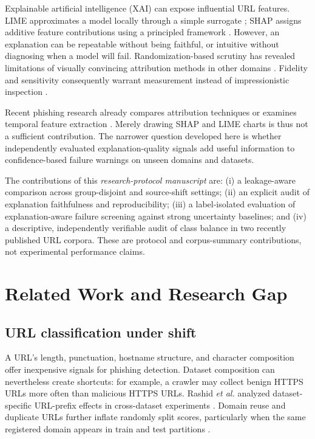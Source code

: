 \documentclass[conference,letterpaper]{IEEEtran}
\begin{document}
Explainable artificial intelligence (XAI) can expose influential URL features. LIME approximates a model locally through a simple surrogate \cite{ribeiro2016}; SHAP assigns additive feature contributions using a principled framework \cite{lundberg2017}. However, an explanation can be repeatable without being faithful, or intuitive without diagnosing when a model will fail. Randomization-based scrutiny has revealed limitations of visually convincing attribution methods in other domains \cite{adebayo2018}. Fidelity and sensitivity consequently warrant measurement instead of impressionistic inspection \cite{yeh2019}.

Recent phishing research already compares attribution techniques or examines temporal feature extraction \cite{panthi2026,mayo2026,limephish2025}. Merely drawing SHAP and LIME charts is thus not a sufficient contribution. The narrower question developed here is whether independently evaluated explanation-quality signals add useful information to confidence-based failure warnings on unseen domains and datasets.

The contributions of this \emph{research-protocol manuscript} are: (i) a leakage-aware comparison across group-disjoint and source-shift settings; (ii) an explicit audit of explanation faithfulness and reproducibility; (iii) a label-isolated evaluation of explanation-aware failure screening against strong uncertainty baselines; and (iv) a descriptive, independently verifiable audit of class balance in two recently published URL corpora. These are protocol and corpus-summary contributions, not experimental performance claims.

\section{Related Work and Research Gap}
\subsection{URL classification under shift}
A URL's length, punctuation, hostname structure, and character composition offer inexpensive signals for phishing detection. Dataset composition can nevertheless create shortcuts: for example, a crawler may collect benign HTTPS URLs more often than malicious HTTPS URLs. Rashid \emph{et al.} analyzed dataset-specific URL-prefix effects in cross-dataset experiments \cite{rashid2024}. Domain reuse and duplicate URLs further inflate randomly split scores, particularly when the same registered domain appears in train and test partitions \cite{datasetquality2025}.
\end{document}
